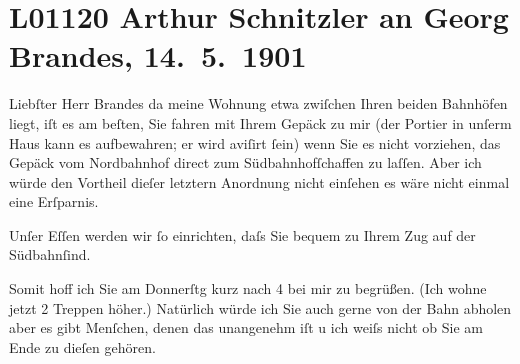 

\section[Arthur Schnitzler an Georg Brandes, 14. 5. 1901]{L01120 Arthur Schnitzler an Georg Brandes, 14. 5. 1901}
\nopagebreak{}
\rehead{ }\normalsize\beginnumbering{}
\toendnotes[C]{\smallbreak\pagebreak[2]}
\toendnotes[C]{\smallbreak}
\pstart{}{\pb}Liebſter Herr Brandes\pend\vspace{0.5em}
\pstart
           da meine Wohnung etwa zwiſchen Ihren beiden Bahnhöfen liegt, iſt es am beſten, Sie
               fahren mit Ihrem Gepäck zu mir (der Portier in unſerm Haus kann es aufbewahren; er
               wird aviſirt{ }ſein) wenn Sie es nicht vorziehen, das Gepäck vom Nordbahnhof direct zum Südbahnhofſchaffen zu laſſen. {\pb}Aber ich würde den Vortheil dieſer letztern
               Anordnung nicht einſehen es wäre nicht einmal eine Erſparnis.\pend
           
\pstart
           Unſer Eſſen werden wir{ }ſo einrichten, daſs Sie bequem zu Ihrem Zug auf der Südbahnſind.\pend
           
\pstart
           Somit hoff ich Sie am Donnerſtg kurz nach 4 bei mir zu
               begrüßen. (Ich wohne jetzt 2 Treppen höher.) Natürlich würde ich Sie auch gerne von
               der Bahn {\pb}abholen aber es gibt Menſchen, denen das
               unangenehm iſt u ich weiſs nicht ob Sie am Ende zu dieſen gehören.\pend
           
